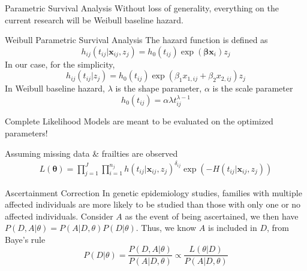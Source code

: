 \documentclass [aspectratio=169]{beamer}
\begin{document}
\begin{frame}{Parametric Survival Analysis}
    Without loss of generality, everything on the current research will be Weibull baseline hazard. 
    \begin{block}{Weibull Parametric Survival Analysis}
        The hazard function is defined as 
        \begin{equation} 
            h_{ij}(t_{ij}|\mathbf{x}_{ij}, z_j)=h_0(t_{ij})\exp(\boldsymbol{\beta}\mathbf{x}_i)z_j
        \end{equation}
        In our case, for the simplicity, 
        \begin{equation} 
            h_{ij}(t_{ij}|z_j)=h_0(t_{ij})\exp(\beta_1x_{1,ij}+\beta_2 x_{2,ij})z_j
        \end{equation}
        In Weibull baseline hazard, $\lambda$ is the shape parameter, $\alpha$ is the scale parameter
        \begin{equation} 
            h_0(t_{ij})=\alpha\lambda t_{ij}^{\lambda-1}
        \end{equation}
    \end{block}
\end{frame}

\begin{frame}{Complete Likelihood}
    Models are meant to be evaluated on the optimized parameters!
    \begin{block}{Assuming missing data \& frailties are observed}
        \begin{align} 
            L(\boldsymbol{\theta})=\prod_{j=1}^J\prod_{i=1}^{n_j} h(t_{ij}|\mathbf{x}_{ij}, z_j)^{\delta_{ij}}\exp (-H(t_{ij}|\mathbf{x}_{ij},z_j))
        \end{align}
    \end{block}
    \begin{block}{Ascertainment Correction}
        In genetic epidemiology studies, families with multiple affected individuals are more likely to be studied than those with only one or no affected individuals.
        Consider $A$ as the event of being ascertained, we then have $P(D, A|\theta)=P(A|D,\theta)P(D|\theta)$. Thus, we know $A$ is included in $D$, from Baye's rule
        \begin{equation} 
            P(D|\theta)= \frac{P(D,A|\theta)}{P(A|D, \theta)}\propto\frac{L(\theta|D)}{P(A|D,\theta)}
        \end{equation}
    \end{block}
\end{frame}
\end{document}

